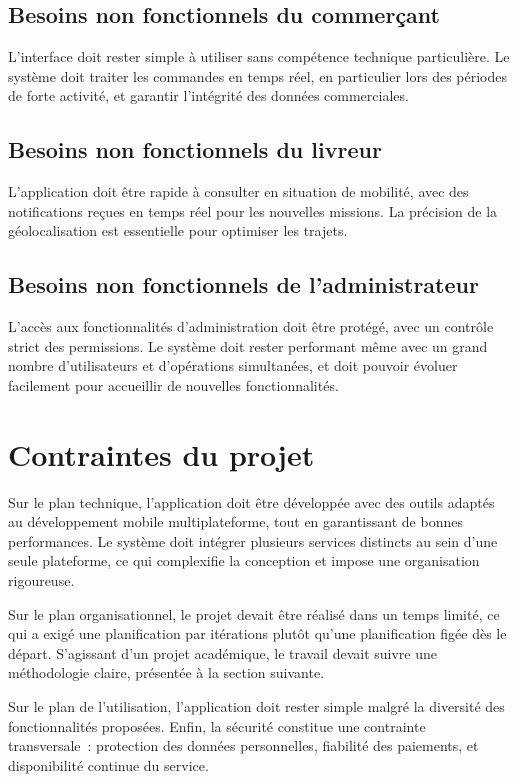 \documentclass[12pt,fleqn,a4paper]{report}
\begin{document}
\begin{justify}
\subsection{Besoins non fonctionnels du commerçant}
L'interface doit rester simple à utiliser sans compétence technique particulière. Le système doit traiter les commandes en temps réel, en particulier lors des périodes de forte activité, et garantir l'intégrité des données commerciales.

\subsection{Besoins non fonctionnels du livreur}
L'application doit être rapide à consulter en situation de mobilité, avec des notifications reçues en temps réel pour les nouvelles missions. La précision de la géolocalisation est essentielle pour optimiser les trajets.

\subsection{Besoins non fonctionnels de l'administrateur}
L'accès aux fonctionnalités d'administration doit être protégé, avec un contrôle strict des permissions. Le système doit rester performant même avec un grand nombre d'utilisateurs et d'opérations simultanées, et doit pouvoir évoluer facilement pour accueillir de nouvelles fonctionnalités.

\section{Contraintes du projet}

Sur le plan technique, l'application doit être développée avec des outils adaptés au développement mobile multiplateforme, tout en garantissant de bonnes performances. Le système doit intégrer plusieurs services distincts au sein d'une seule plateforme, ce qui complexifie la conception et impose une organisation rigoureuse.

Sur le plan organisationnel, le projet devait être réalisé dans un temps limité, ce qui a exigé une planification par itérations plutôt qu'une planification figée dès le départ. S'agissant d'un projet académique, le travail devait suivre une méthodologie claire, présentée à la section suivante.

Sur le plan de l'utilisation, l'application doit rester simple malgré la diversité des fonctionnalités proposées. Enfin, la sécurité constitue une contrainte transversale~: protection des données personnelles, fiabilité des paiements, et disponibilité continue du service.


\end{justify}
\end{document}
